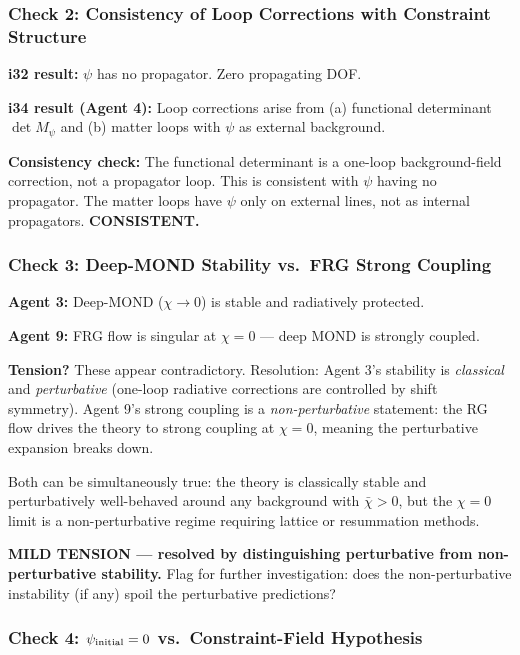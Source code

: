 \documentclass[11pt,a4paper]{article}
\begin{document}
\subsubsection{Check 2: Consistency of Loop Corrections with Constraint Structure}

\textbf{i32 result:} $\psi$ has no propagator. Zero propagating DOF.

\textbf{i34 result (Agent 4):} Loop corrections arise from (a) functional determinant $\det M_\psi$ and (b) matter loops with $\psi$ as external background.

\textbf{Consistency check:} The functional determinant is a one-loop background-field correction, not a propagator loop. This is consistent with $\psi$ having no propagator. The matter loops have $\psi$ only on external lines, not as internal propagators. \textcolor{dfdgreen}{\textbf{CONSISTENT.}}

\subsubsection{Check 3: Deep-MOND Stability vs.\ FRG Strong Coupling}

\textbf{Agent 3:} Deep-MOND ($\chi \to 0$) is stable and radiatively protected.

\textbf{Agent 9:} FRG flow is singular at $\chi = 0$ --- deep MOND is strongly coupled.

\textbf{Tension?} These appear contradictory. Resolution: Agent 3's stability is \emph{classical} and \emph{perturbative} (one-loop radiative corrections are controlled by shift symmetry). Agent 9's strong coupling is a \emph{non-perturbative} statement: the RG flow drives the theory to strong coupling at $\chi = 0$, meaning the perturbative expansion breaks down.

Both can be simultaneously true: the theory is classically stable and perturbatively well-behaved around any background with $\bar\chi > 0$, but the $\chi = 0$ limit is a non-perturbative regime requiring lattice or resummation methods.

\textcolor{dfdyellow}{\textbf{MILD TENSION --- resolved by distinguishing perturbative from non-perturbative stability.}} Flag for further investigation: does the non-perturbative instability (if any) spoil the perturbative predictions?

\subsubsection{Check 4: $\psi_{\rm initial} = 0$ vs.\ Constraint-Field Hypothesis}
\end{document}
